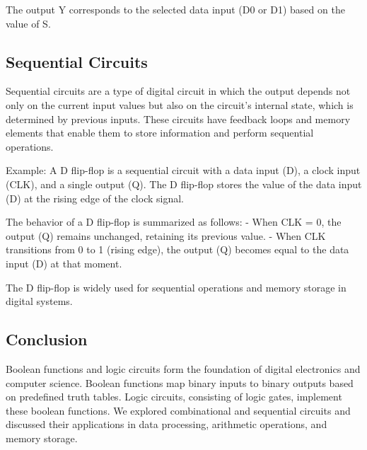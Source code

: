 \documentclass{article}
\begin{document}

The output Y corresponds to the selected data input (D0 or D1) based on the value of S.

\subsection{Sequential Circuits}

Sequential circuits are a type of digital circuit in which the output depends not only on the current input values but also on the circuit's internal state, which is determined by previous inputs. These circuits have feedback loops and memory elements that enable them to store information and perform sequential operations.

Example: A D flip-flop is a sequential circuit with a data input (D), a clock input (CLK), and a single output (Q). The D flip-flop stores the value of the data input (D) at the rising edge of the clock signal.

The behavior of a D flip-flop is summarized as follows:
- When CLK = 0, the output (Q) remains unchanged, retaining its previous value.
- When CLK transitions from 0 to 1 (rising edge), the output (Q) becomes equal to the data input (D) at that moment.

The D flip-flop is widely used for sequential operations and memory storage in digital systems.

\subsection{Conclusion}

Boolean functions and logic circuits form the foundation of digital electronics and computer science. Boolean functions map binary inputs to binary outputs based on predefined truth tables. Logic circuits, consisting of logic gates, implement these boolean functions. We explored combinational and sequential circuits and discussed their applications in data processing, arithmetic operations, and memory storage.
\end{document}
